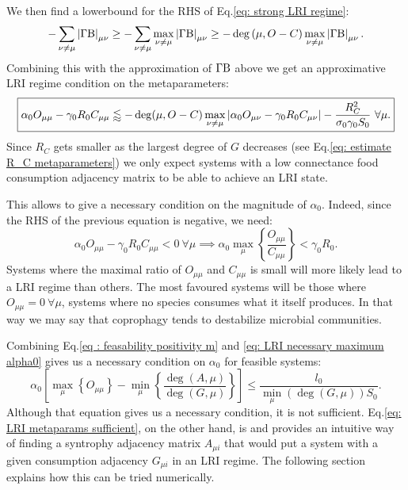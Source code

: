 \documentclass[12pt, titlepage]{report}
\begin{document}
We then find a lowerbound for the RHS of Eq.\eqref{eq: strong LRI regime}:
\begin{equation}
-\sum_{\nu\neq\mu}\left|{\Gamma\text{B}}\right|_{\mu\nu} \geq - \sum_{\nu \neq \mu} \max_{\nu \neq \mu} \left|{\Gamma\text{B}}\right|_{\mu\nu} \geq - \deg\left(\mu, O-C \right) \max_{\nu \neq \mu} \left|{\Gamma\text{B}}\right|_{\mu\nu}.
\end{equation}
Combining this with the approximation of $\Gamma\text{B}$ above we get an approximative LRI regime condition on the metaparameters:
\begin{equation}\boxed{
\alpha_0 O_{\mu \mu}-\gamma_0R_0 C_{\mu\mu} \lessapprox - \deg(\mu, O-C) \max_{\nu\neq\mu}\left|{\alpha_0 O_{\mu \nu}-\gamma_0 R_0 C_{\mu\nu}}\right|-\frac{R_C^2}{\sigma_0\gamma_0 S_0} \ \forall \mu.
}\label{eq: LRI metaparams sufficient}
\end{equation}
Since $R_C$ gets smaller as the largest degree of $G$ decreases (see Eq.\ref{eq: estimate R_C metaparameters}) we only expect systems with a low connectance food consumption adjacency matrix to be able to achieve an LRI state.

This allows to give a necessary condition on the magnitude of $\alpha_0$. Indeed, since the RHS of the previous equation is negative, we need:
\begin{equation}
\alpha_0 O_{\mu \mu}-\gamma_0 R_0 C_{\mu\mu} < 0 \ \forall \mu \implies {\alpha_0 \max_\mu \left\{ \frac{O_{\mu\mu}}{C_{\mu\mu}}  \right\} < \gamma_0 R_0 .} \label{eq: LRI necessary maximum alpha0}
\end{equation}
Systems where the maximal ratio of $O_{\mu\mu}$ and $C_{\mu\mu}$ is small will more likely lead to a LRI regime than others. The most favoured systems will be those where $O_{\mu\mu}=0 \ \forall \mu$, \ie systems where no species consumes what it itself produces. In that way we may say that coprophagy tends to destabilize microbial communities.

Combining Eq.\eqref{eq : feasability positivity m} and \eqref{eq: LRI necessary maximum alpha0} gives us a necessary condition on $\alpha_0$ for feasible systems:
\begin{equation}
\boxed{
\alpha_0 \left[\max_\mu \left\{O_{\mu\mu}\right\}-\min_\mu \left\{ \frac{\deg(A,\mu)}{\deg(G,\mu)} \right\} \right] \leq \frac{l_0}{\min_\mu\left(\deg(G,\mu)\right)S_0}}.
\end{equation}
Although that equation gives us a necessary condition, it is not sufficient. Eq.\eqref{eq: LRI metaparams sufficient}, on the other hand, is and provides an intuitive way of finding a syntrophy adjacency matrix $A_{\mu i}$ that would put a system with a given consumption adjacency $G_{\mu i}$ in an LRI regime. The following section explains how this can be tried numerically.
\end{document}
